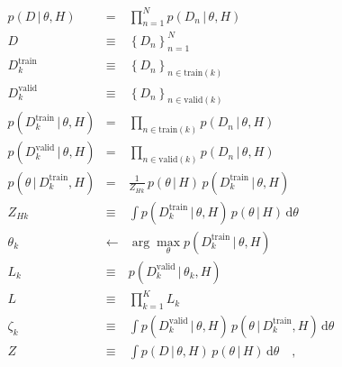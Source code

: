 \documentclass[12pt]{article}
\newcommand{\given}{\,|\,}
\newcommand{\setof}[1]{\left\{{#1}\right\}}
\newcommand{\train}{\mathrm{train}}
\newcommand{\valid}{\mathrm{valid}}
\newcommand{\dd}{\mathrm{d}}
\begin{document}
\begin{eqnarray}
p(D\given\theta,H) &=& \prod_{n=1}^N p(D_n\given\theta,H)
\\
D &\equiv& \setof{D_n}_{n=1}^N
\\
D^\train_k &\equiv& \setof{D_n}_{n\in\train(k)}
\\
D^\valid_k &\equiv& \setof{D_n}_{n\in\valid(k)}
\\
p(D^\train_k\given\theta,H) &=& \prod_{n\in\train(k)} p(D_n\given\theta,H)
\\
p(D^\valid_k\given\theta,H) &=& \prod_{n\in\valid(k)} p(D_n\given\theta,H)
\\
p(\theta\given D^\train_k,H) &=& \frac{1}{Z_{Hk}}\,p(\theta\given H)\,p(D^\train_k\given\theta,H)
\\
Z_{Hk} &\equiv& \int p(D^\train_k\given\theta,H)\,p(\theta\given H)\,\dd\theta
\\
\theta_k &\leftarrow& \arg\max_\theta p(D^\train_k\given\theta,H)
\\
L_k &\equiv& p(D^\valid_k\given\theta_k,H)
\\
L &\equiv& \prod_{k=1}^K L_k
\\
\zeta_k &\equiv& \int p(D^\valid_k\given\theta,H)\,p(\theta\given D^\train_k,H)\,\dd\theta
\\
Z &\equiv& \int p(D\given\theta,H)\,p(\theta\given H)\,\dd\theta
\quad,
\end{eqnarray}
\end{document}
